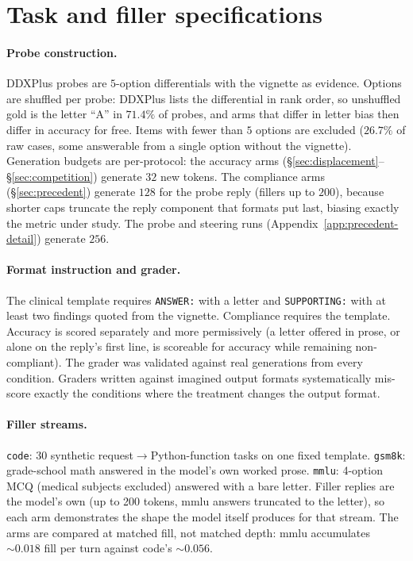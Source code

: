 \documentclass{article}
\begin{document}
\section{Task and filler specifications}
\label{app:tasks}

\paragraph{Probe construction.}
DDXPlus probes are $5$-option differentials with the vignette as evidence. Options are shuffled
per probe: DDXPlus lists the differential in rank order, so unshuffled gold is the letter ``A''
in $71.4\%$ of probes, and arms that differ in letter bias then differ in accuracy for free.
Items with fewer than $5$ options are excluded ($26.7\%$ of raw cases, some answerable from
a single option without the vignette). Generation budgets are per-protocol: the accuracy arms
(\S\ref{sec:displacement}--\S\ref{sec:competition}) generate $32$ new tokens. The compliance
arms (\S\ref{sec:precedent}) generate $128$ for the probe reply (fillers up to $200$), because
shorter caps truncate the reply component that formats put last, biasing exactly the metric
under study. The probe and steering runs (Appendix~\ref{app:precedent-detail}) generate $256$.

\paragraph{Format instruction and grader.}
The clinical template requires \texttt{ANSWER:} with a letter and \texttt{SUPPORTING:} with at
least two findings quoted from the vignette. Compliance requires the template. Accuracy is
scored separately and more permissively (a letter offered in prose, or alone on the reply's
first line, is scoreable for accuracy while remaining non-compliant). The grader was validated
against real generations from every condition. Graders written against imagined output formats
systematically mis-score exactly the conditions where the treatment changes the output format.

\paragraph{Filler streams.}
\texttt{code}: 30 synthetic request$\to$Python-function tasks on one fixed template.
\texttt{gsm8k}: grade-school math answered in the model's own worked prose. \texttt{mmlu}:
4-option MCQ (medical subjects excluded) answered with a bare letter. Filler replies are the
model's own (up to 200 tokens, mmlu answers truncated to the letter), so each arm demonstrates
the shape the model itself produces for that stream. The arms are compared at matched fill, not
matched depth: mmlu accumulates ${\sim}0.018$ fill per turn against code's ${\sim}0.056$.
\end{document}
